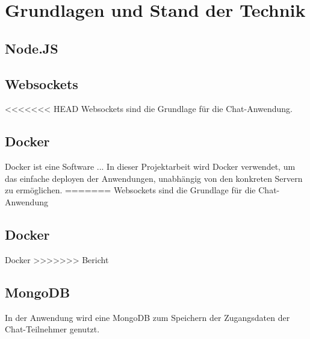 
\chapter{Grundlagen und Stand der Technik}\label{cha:Grundlagen}
\section{Node.JS}\label{sec:Node.JS}

\section{Websockets}\label{sec:Websockets}
<<<<<<< HEAD
Websockets sind die Grundlage für die Chat-Anwendung.
\section{Docker}\label{sec:Docker}
Docker ist eine Software ... In dieser Projektarbeit wird Docker verwendet, um das einfache deployen der Anwendungen, unabhängig von den konkreten Servern zu ermöglichen.
=======
Websockets sind die Grundlage für die Chat-Anwendung
\section{Docker}\label{sec:Docker}
Docker 
>>>>>>> Bericht
\section{MongoDB}\label{sec:MongoDB}
In der Anwendung wird eine MongoDB zum Speichern der Zugangsdaten der Chat-Teilnehmer genutzt.